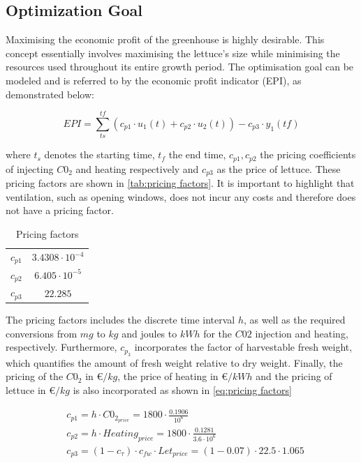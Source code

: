 \subsection{Optimization Goal}
\label{ssection:optimization-goal}
Maximising the economic profit of the greenhouse is highly desirable. This concept essentially involves maximising the lettuce's size while minimising the resources used throughout its entire growth period. The optimisation goal can be modeled and is referred to by the economic profit indicator (EPI), as demonstrated below:

\begin{equation}
	EPI = \sum_{ts}^{tf} (c_{p1} \cdot u_1(t) + c_{p2} \cdot u_2(t)) - c_{p3} \cdot y_1(tf)
\end{equation}

where $t_s$ denotes the starting time, $t_f$ the end time, $c_{p1},c_{p2}$ the pricing coefficients of injecting $C0_2$ and heating respectively and $c_{p3}$ as the price of lettuce. These pricing factors are shown in \autoref{tab:pricing factors}. It is important to highlight that ventilation, such as opening windows, does not incur any costs and therefore does not have a pricing factor.

\begin{table}[H]
	\centering
	\begin{tabular}{|c c|}
		\hline
		$c_{p1}$& $3.4308\cdot 10^{-4}$ \\
		$c_{p2}$& $6.405\cdot 10^{-5}$\\
		$c_{p3}$& $22.285$\\ 
		\hline
	\end{tabular}
	\caption{Pricing factors}
	\label{tab:pricing factors}
\end{table}

The pricing factors includes the discrete time interval $h$, as well as the required conversions from $mg$ to $kg$ and joules to $kWh$ for the $C02$ injection and heating, respectively. Furthermore, $c_{p_3}$ incorporates the factor of harvestable fresh weight, which quantifies the amount of fresh weight relative to dry weight. Finally, the pricing of the $C0_2$ in \euro $/kg$, the price of heating in \euro$/kWh$ and the pricing of lettuce in \euro$/kg$ is also incorporated as shown in \autoref{eq:pricing factors}

\begin{equation}\label{eq:pricing factors}
	\begin{aligned}
		& c_{p1} = h \cdot C0_{2_{price}}  = 1800 \cdot \frac{0.1906}{10^{6}}\\
		& c_{p2} = h \cdot  Heating_{price} = 1800 \cdot \frac{0.1281}{3.6\cdot 10^{6}}\\
		& c_{p3} = (1-c_{\tau})  \cdot c_{fw} \cdot Let_{price}= (1-0.07) \cdot 22.5 \cdot 1.065 \\
	\end{aligned}
\end{equation}


